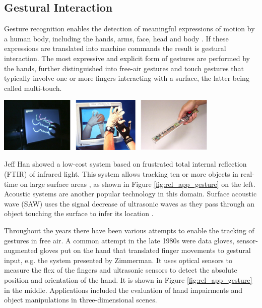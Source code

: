 \subsection{Gestural Interaction}
Gesture recognition enables the detection of meaningful expressions of motion by a human body, including the hands, arms, face, head and body \cite{mitra2007gesture}	. If these expressions are translated into machine commands the result is gestural interaction. The most expressive and explicit form of gestures are performed by the hands, further distinguished into free-air gestures and touch gestures that typically involve one or more fingers interacting with a surface, the latter being called multi-touch.

\begin{minipage}{\linewidth}
\centering
\includegraphics[width=0.8\textwidth]{images/rel_app_gesture}
\label{fig:rel_app_gesture}
\end{minipage}

Jeff Han showed a low-cost system based on frustrated total internal reflection (FTIR) of infrared light. This system allows tracking ten or more objects in real-time on large surface areas \cite{Han2005}, as shown in Figure \ref{fig:rel_app_gesture} on the left. Acoustic systems are another popular technology in this domain. Surface acoustic wave (SAW) uses the signal decrease of ultrasonic waves as they pass through an object touching the surface to infer its location \cite{Armstrong1998}.
  
Throughout the years there have been various attempts to enable the tracking of gestures in free air. A common attempt in the late 1980s were data gloves, sensor-augmented gloves put on the hand that translated finger movements to gestural input, e.g. the system presented by Zimmerman\cite{zimmerman1987hand}. It uses optical sensors to measure the flex of the fingers and ultrasonic sensors to detect the absolute position and orientation of the hand. It is shown in Figure \ref{fig:rel_app_gesture} in the middle. Applications included the evaluation of hand impairments and object manipulations in three-dimensional scenes.

